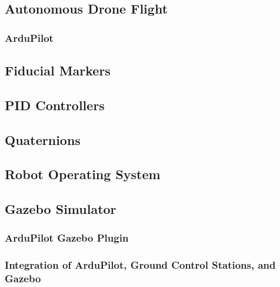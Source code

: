 \subsection{Autonomous Drone Flight}
\label{subsection:autonomous_drone_flight}


\subsubsection{ArduPilot}
\label{subsection:ardupilot}


\subsection{Fiducial Markers}
\label{subsection:fiducial_markers}


\subsection{PID Controllers}


\subsection{Quaternions}
\label{subsection:quaternions}


\subsection{Robot Operating System}
\label{subsection_ros}


\subsection{Gazebo Simulator}
\label{subsection:gazebo}


\subsubsection{ArduPilot Gazebo Plugin}
\label{subsection:ardupilot_gazebo}


\subsubsection{Integration of ArduPilot, Ground Control Stations, and Gazebo}
\label{subsection:gcs}
